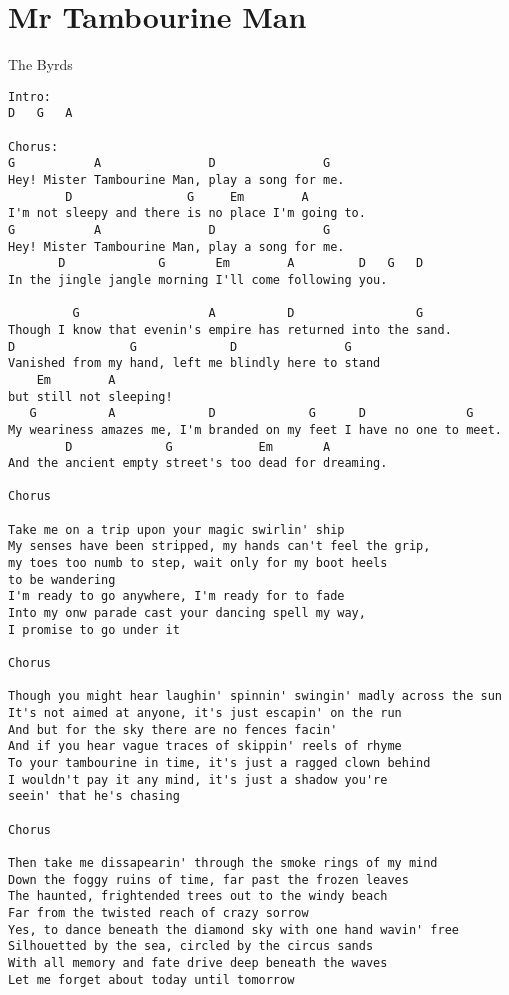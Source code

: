 \section{Mr Tambourine Man} \label{sec:song5}
The Byrds
\begin{verbatim}
Intro:
D   G   A

Chorus:
G           A               D               G
Hey! Mister Tambourine Man, play a song for me.
        D                G     Em        A
I'm not sleepy and there is no place I'm going to.
G           A               D               G
Hey! Mister Tambourine Man, play a song for me.
       D             G       Em        A         D   G   D
In the jingle jangle morning I'll come following you.

         G                  A          D                 G
Though I know that evenin's empire has returned into the sand.
D                G             D               G
Vanished from my hand, left me blindly here to stand 
    Em        A
but still not sleeping!
   G          A             D             G      D              G
My weariness amazes me, I'm branded on my feet I have no one to meet.
        D             G            Em       A
And the ancient empty street's too dead for dreaming.

Chorus

Take me on a trip upon your magic swirlin' ship
My senses have been stripped, my hands can't feel the grip, 
my toes too numb to step, wait only for my boot heels
to be wandering
I'm ready to go anywhere, I'm ready for to fade
Into my onw parade cast your dancing spell my way,
I promise to go under it

Chorus

Though you might hear laughin' spinnin' swingin' madly across the sun
It's not aimed at anyone, it's just escapin' on the run
And but for the sky there are no fences facin'
And if you hear vague traces of skippin' reels of rhyme
To your tambourine in time, it's just a ragged clown behind
I wouldn't pay it any mind, it's just a shadow you're
seein' that he's chasing

Chorus

Then take me dissapearin' through the smoke rings of my mind
Down the foggy ruins of time, far past the frozen leaves
The haunted, frightended trees out to the windy beach
Far from the twisted reach of crazy sorrow
Yes, to dance beneath the diamond sky with one hand wavin' free
Silhouetted by the sea, circled by the circus sands
With all memory and fate drive deep beneath the waves
Let me forget about today until tomorrow
\end{verbatim}

